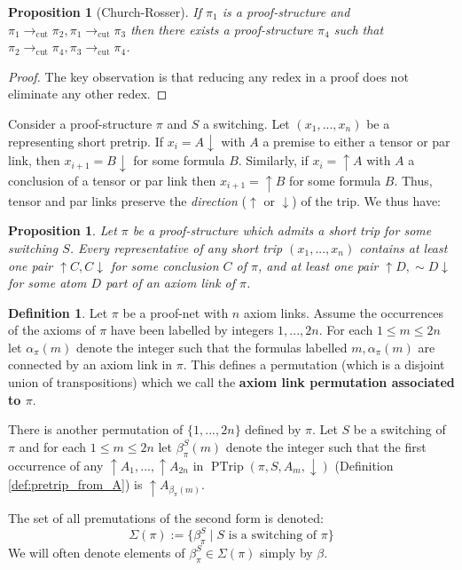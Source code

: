 \documentclass[12pt]{article}
\theoremstyle{plain}
\newtheorem{proposition}[thm]{Proposition}
\theoremstyle{definition}
\newtheorem{defn}[thm]{Definition} %
\newcommand{\lto}{\longrightarrow}
\newcommand{\negation}{\sim}
\begin{document}
\begin{proposition}[Church-Rosser]\label{prop:church_rosser}
If $\pi_1$ is a proof-structure and $\pi_1 \lto_{\operatorname{cut}} \pi_2, \pi_1 \lto_{\operatorname{cut}} \pi_3$ then there exists a proof-structure $\pi_4$ such that $\pi_2 \lto_{\operatorname{cut}} \pi_4, \pi_3 \lto_{\operatorname{cut}} \pi_4$.
\end{proposition}
\begin{proof}
The key observation is that reducing any redex in a proof does not eliminate any other redex.
\end{proof}
Consider a proof-structure $\pi$ and $S$ a switching. Let $(x_1,...,x_n)$ be a representing short pretrip. If $x_i = A\downarrow$ with $A$ a premise to either a tensor or par link, then $x_{i+1} = B\downarrow$ for some formula $B$. Similarly, if $x_i = \uparrow A$ with $A$ a conclusion of a tensor or par link then $x_{i+1} = \uparrow B$ for some formula $B$. Thus, tensor and par links preserve the \emph{direction} ($\uparrow$ or $\downarrow$) of the trip. We thus have:
\begin{proposition}\label{prop:short_trips_and_axioms}
Let $\pi$ be a proof-structure which admits a short trip for some switching $S$. Every representative of any short trip $(x_1,...,x_n)$ contains at least one pair $\uparrow C, C\downarrow$ for some conclusion $C$ of $\pi$, and at least one pair $\uparrow D, \negation D\downarrow$ for some atom $D$ part of an axiom link of $\pi$.
\end{proposition}
\begin{defn}\label{def:permutations}
Let $\pi$ be a proof-net with $n$ axiom links. Assume the occurrences of the axioms of $\pi$ have been labelled by integers $1,...,2n$. For each $1 \leq m \leq 2n$ let $\alpha_{\pi}(m)$ denote the integer such that the formulas labelled $m,\alpha_{\pi}(m)$ are connected by an axiom link in $\pi$. This defines a permutation (which is a disjoint union of transpositions) which we call the \textbf{axiom link permutation associated to $\pi$}.

There is another permutation of $\lbrace 1,...,2n\rbrace$ defined by $\pi$. Let $S$ be a switching of $\pi$ and for each $1 \leq m \leq 2n$ let $\beta_{\pi}^S(m)$ denote the integer such that the first occurrence of any $\uparrow A_1,...,\uparrow A_{2n}$ in $\operatorname{PTrip}(\pi,S,A_m,\downarrow)$ (Definition \ref{def:pretrip_from_A}) is $\uparrow A_{\beta_{\pi}(m)}$.

The set of all premutations of the second form is denoted:
\begin{equation}
    \Sigma(\pi) := \lbrace \beta_{\pi}^S \mid S\text{ is a switching of }\pi\rbrace
\end{equation}
We will often denote elements of $\beta_{\pi}^S \in \Sigma(\pi)$ simply by $\beta$.
\end{defn}
\end{document}
